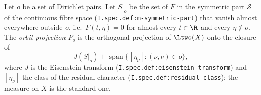 Let $o$ be a set of Dirichlet pairs. Let $S|_o$ be the set of $F$ in the symmetric part $\mathcal S$ of the continuous fibre space (\texttt{I.spec.def:m-symmetric-part}) that vanish almost everywhere outside $o$, i.e.\ $F(t,\eta)=0$ for almost every $t\in\R$ and every $\eta\notin o$. The \emph{orbit projection} $P_o$ is the orthogonal projection of $\Ltwo(X)$ onto the closure of
\[
  J(S|_o)+\operatorname{span}\{[\eta_\nu]:(\nu,\nu)\in o\},
\]
where $J$ is the Eisenstein transform (\texttt{I.spec.def:eisenstein-transform}) and $[\eta_\nu]$ the class of the residual character (\texttt{I.spec.def:residual-class}); the measure on $X$ is the standard one.
